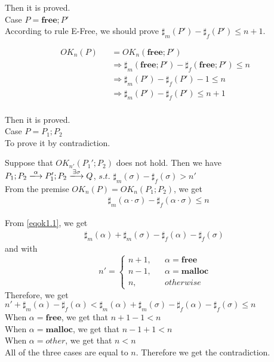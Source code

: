 \documentclass[english]{jssst_ppl} %
\newcommand\Malloc{\mathbf{malloc}}
\newcommand\Free{\mathbf{free}}
\begin{document}
Then it is proved.\\

\noindent Case $P = \Free;P'$ \\

According to rule E-Free, we should prove $\sharp_{m}(P') - \sharp_{f}(P') \le n+1$.

\begin{eqnarray*}
  OK_{n}(P)  & & =  OK_{n}(\Free;P')\\
  & &\Rightarrow  \sharp_{m}(\Free;P') - \sharp_{f}(\Free;P') \le n \\
  & & \Rightarrow \sharp_{m}(P')  - \sharp_{f}(P') - 1  \le n\\
  & & \Rightarrow \sharp_{m}(P')  - \sharp_{f}(P') \le n+1\\
\end{eqnarray*}

Then it is proved. \\

\noindent Case $P = P_{1};P_{2}$\\

To prove it by contradiction.

Suppose that $OK_{n'}(P_{1}';P_{2})$ does not hold. Then we have 
$P_{1};P_{2} \xlongrightarrow{\alpha} P_{1}';P_{2} \xlongrightarrow{\exists \sigma} Q$, $s.t.$ $\sharp_{m}(\sigma) - \sharp_{f}(\sigma) > n'$\\

From the premise $OK_{n}(P) = OK_{n}(P_{1};P_{2})$, we get 
\setcounter{equation}{0}
\begin{align}
  &  \sharp_{m}(\alpha \cdot \sigma) - \sharp_{f}(\alpha \cdot \sigma) \le n \label{eqok1.1}
\end{align}

From \eqref{eqok1.1}, we get
\begin{align}
\sharp_{m}(\alpha) + \sharp_{m}(\sigma) - \sharp_{f}(\alpha) - \sharp_{f}(\sigma) \  \label{eqok1.2}
\end{align}
and with
$$
   n'=\left\{
   \begin{aligned}
     n + 1, && \alpha = \Free \\
     n - 1,  && \alpha = \Malloc  \\
     n ,      && otherwise
   \end{aligned}
   \right.
$$
Therefore, we get \\
$n' + \sharp_{m}(\alpha) - \sharp_{f}(\alpha) < \sharp_{m}(\alpha) + \sharp_{m}(\sigma) - \sharp_{f}(\alpha) - \sharp_{f}(\sigma) \le n $ \\
When $\alpha = \Free$, we get that $n + 1 - 1 < n$\\
When $\alpha = \Malloc$, we get that $ n - 1 + 1 < n $ \\
When $ \alpha = other$,  we  get that $ n < n $ \\
 All of the three cases are equal to $n$. Therefore we get the contradiction.
\end{document}
